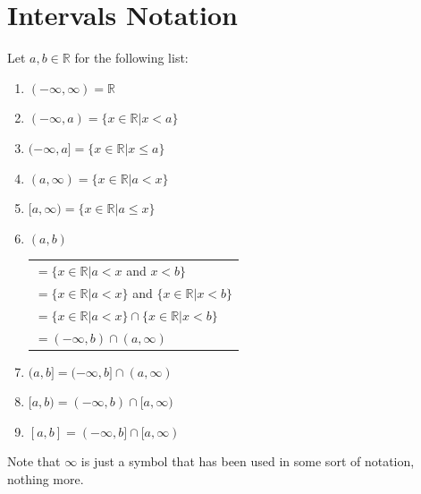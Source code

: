 \section{Intervals Notation}\label{sec:intervals}
Let $a, b \in \mathbb{R}$ for the following list:
\begin{enumerate}
    \item $(-\infty, \infty) = \mathbb{R}$
    \item $(-\infty, a) = \{x \in \mathbb{R}|x < a\}$
    \item $(-\infty, a] = \{x \in \mathbb{R}|x \le a\}$
    \item $(a, \infty) = \{x \in \mathbb{R}|a < x\}$
    \item $[a, \infty) = \{x \in \mathbb{R}|a \le x\}$
    \item $(a, b)$ 
    \begin{tabular}[t]{l}
        $=\{x \in \mathbb{R}|a < x$ and $x < b\}$  \\
        $=\{x \in \mathbb{R}|a < x\}$ and $\{x \in \mathbb{R}|x < b\}$ \\
        $=\{x \in \mathbb{R}|a < x\} \cap \{x \in \mathbb{R}|x < b\}$ \\
        $= (-\infty, b) \cap (a, \infty)$
    \end{tabular}
    \item $(a, b]= (-\infty, b] \cap (a, \infty)$
    \item $[a, b)= (-\infty, b) \cap [a, \infty)$
    \item $[a, b]= (-\infty, b] \cap [a, \infty)$
\end{enumerate}
Note that $\infty$ is just a symbol that has been used in some sort of notation, nothing more.